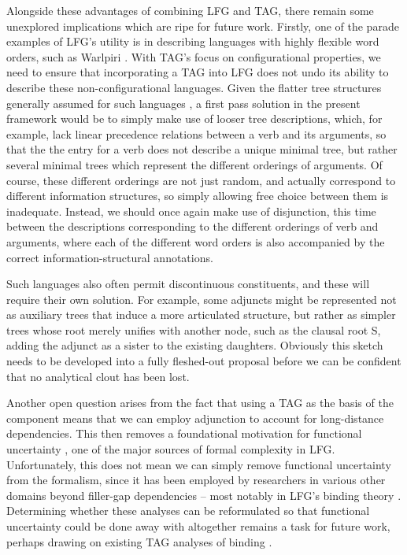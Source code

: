 \documentclass[output=paper,hidelinks]{langscibook}
\begin{document}
Alongside these advantages of combining LFG and TAG, there remain some
unexplored implications which are ripe for future work. Firstly, one of the
parade examples of LFG's utility is in describing languages with highly flexible
word orders, such as Warlpiri \citep[see e.g.][ch.~1]{BresnanEtAl2016}. With
TAG's focus on configurational properties, we need to ensure that incorporating
a TAG into LFG does not undo its ability to describe these non-configurational
languages. Given the flatter tree structures generally assumed for such
languages \citep{Simpson1991,AustBres96}, a first pass solution in the present
framework would be to simply make use of looser tree descriptions, which, for
example, lack linear precedence relations between a verb and its arguments, so
that the the entry for a verb does not describe a unique minimal tree, but
rather several minimal trees which represent the different orderings of
arguments. Of course, these different orderings are not just random, and
actually correspond to different information structures, so simply allowing free
choice between them is inadequate. Instead, we should once again make use of
disjunction, this time between the descriptions corresponding to the different
orderings of verb and arguments, where each of the different word orders is also
accompanied by the correct information-structural annotations.

Such languages also often permit discontinuous constituents, and these will
require their own solution. For example, some adjuncts might be represented not
as auxiliary trees that induce a more articulated structure, but rather as
simpler trees whose root merely unifies with another node, such as the clausal
root S, adding the adjunct as a sister to the existing daughters. Obviously this
sketch needs to be developed into a fully fleshed-out proposal before we can be
confident that no analytical clout has been lost.

Another open question arises from the fact that using a TAG as the basis of the
\cstruc{} component means that we can employ adjunction to account for
long-distance dependencies. This then removes a foundational motivation for
functional uncertainty \citep{kaplzaen89}, one of the major sources of formal
complexity in LFG. Unfortunately, this does not mean we can simply remove
functional uncertainty from the formalism, since it has been employed by
researchers in various other domains beyond filler-gap dependencies -- most
notably in LFG's binding theory \citep[e.g.][]{dalrymple1993,DalrympleAl17}.
Determining whether these analyses can be reformulated so that functional
uncertainty could be done away with altogether remains a task for future work,
perhaps drawing on existing TAG analyses of binding
\citep[e.g.][]{Ryant:Scheffler:06,Champollion:08-binding,Storoshenko:etal:08,Storoshenko:Han:13}.
\end{document}
